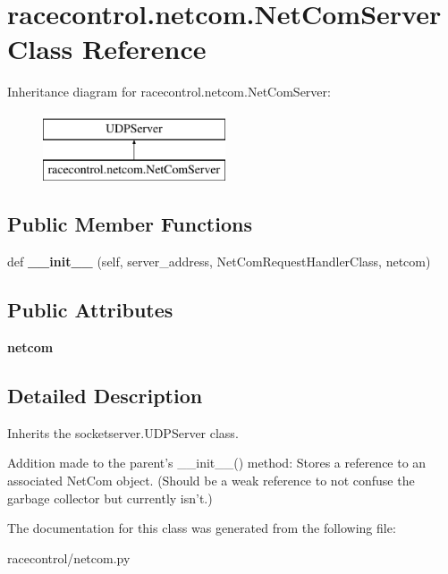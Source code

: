\hypertarget{classracecontrol_1_1netcom_1_1NetComServer}{}\section{racecontrol.\+netcom.\+Net\+Com\+Server Class Reference}
\label{classracecontrol_1_1netcom_1_1NetComServer}
Inheritance diagram for racecontrol.\+netcom.\+Net\+Com\+Server\+:\begin{figure}[H]
\begin{center}
\leavevmode
\includegraphics[height=2.000000cm]{classracecontrol_1_1netcom_1_1NetComServer}
\end{center}
\end{figure}
\subsection*{Public Member Functions}
\begin{DoxyCompactItemize}
\item 
def {\bfseries \+\_\+\+\_\+init\+\_\+\+\_\+} (self, server\+\_\+address, Net\+Com\+Request\+Handler\+Class, netcom)\hypertarget{classracecontrol_1_1netcom_1_1NetComServer_a9bb05aad9d87c4e06b41c06d6226e91e}{}\label{classracecontrol_1_1netcom_1_1NetComServer_a9bb05aad9d87c4e06b41c06d6226e91e}

\end{DoxyCompactItemize}
\subsection*{Public Attributes}
\begin{DoxyCompactItemize}
\item 
{\bfseries netcom}\hypertarget{classracecontrol_1_1netcom_1_1NetComServer_ae4138cdb5ab515c42227886ff80bf88c}{}\label{classracecontrol_1_1netcom_1_1NetComServer_ae4138cdb5ab515c42227886ff80bf88c}

\end{DoxyCompactItemize}


\subsection{Detailed Description}
\begin{DoxyVerb}Inherits the socketserver.UDPServer class.

Addition made to the parent's __init__() method: Stores a reference to an
associated NetCom object. (Should be a weak reference to not confuse the
garbage collector but currently isn't.)
\end{DoxyVerb}
 

The documentation for this class was generated from the following file\+:\begin{DoxyCompactItemize}
\item 
racecontrol/netcom.\+py\end{DoxyCompactItemize}
